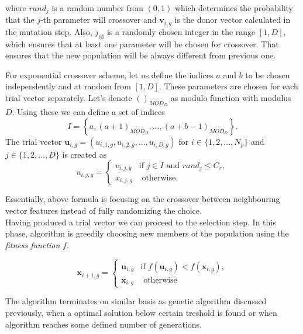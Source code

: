 \documentclass[12pt,a4paper,openany]{book}
\begin{document}
\noindent where $rand_{j}$ is a random number from $(0,1)$ which determines the probability that the $j$-th parameter will crossover and $\mathbf{v}_{i, g}$ is the donor vector calculated in the mutation step. Also, $j_{\mathrm{rd}}$ is a randomly chosen integer in the range $[1, D]$, which ensures that at least one parameter will be chosen for crossover. That ensures that the new population will be always different from previous one.\

For exponential crossover scheme, let us define the indices $a$ and $b$ to be chosen independently and at random from $[1, D]$. These parameters are chosen for each trial vector separately. Let's denote $\left(\right)_{MOD_{D}}$ as modulo function with modulus $D$. Using these we can define a set of indices
\begin{equation}
I = \left\lbrace a, \left(a+1\right)_{MOD_{D}}, \ldots, \left(a+b-1\right)_{MOD_{D}}\right\rbrace.
\end{equation}
The trial vector $\mathbf{u}_{i, g}=\left(u_{i, 1, g}, u_{i, 2, g}, \ldots, u_{i, D, g}\right)$ for $i \in \{1, 2, ..., N_{p}\}$ and $j \in \{1, 2, ..., D\}$ is created as
\begin{equation}
u_{i, j, g}=\left\{\begin{array}{cc}
v_{i, j, g} & \text {if } j \in I \text { and } rand_{j} \leqslant C_{r}, \\
x_{i, j, g} & \text { otherwise. }
\end{array}\right.
\end{equation}

\noindent Essentially, above formula is focusing on the crossover between neighbouring vector features instead of fully randomizing the choice.\\
Having produced a trial vector we can proceed to the selection step. In this phase, algorithm is greedily choosing new members of the population using the \textit{fitness function} $f$.

\begin{equation}
\mathbf{x}_{i+1, g}=\left\{\begin{array}{ll}
\mathbf{u}_{i, g} & \text {if } f\left(\mathbf{u}_{i, g}\right)<f\left(\mathbf{x}_{i, g}\right), \\
\mathbf{x}_{i, g} & \text { otherwise }
\end{array}\right.
\end{equation}

The algorithm terminates on similar basis as genetic algorithm discussed previously, when a optimal solution below certain treshold is found or when algorithm reaches some defined number of generations.
\end{document}

